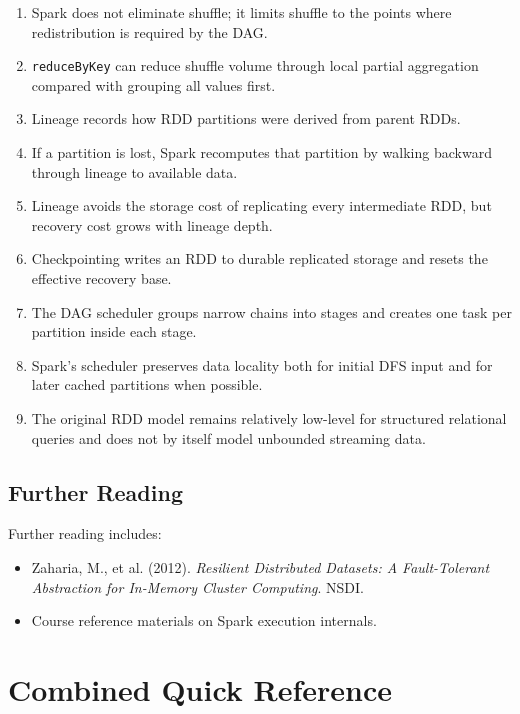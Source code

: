 \documentclass[11pt,a4paper,oneside]{book}
\begin{document}
\begin{enumerate}
    \item Spark does not eliminate shuffle; it limits shuffle to the points where redistribution is required by the DAG.
    \item \texttt{reduceByKey} can reduce shuffle volume through local partial aggregation compared with grouping all values first.
    \item Lineage records how RDD partitions were derived from parent RDDs.
    \item If a partition is lost, Spark recomputes that partition by walking backward through lineage to available data.
    \item Lineage avoids the storage cost of replicating every intermediate RDD, but recovery cost grows with lineage depth.
    \item Checkpointing writes an RDD to durable replicated storage and resets the effective recovery base.
    \item The DAG scheduler groups narrow chains into stages and creates one task per partition inside each stage.
    \item Spark's scheduler preserves data locality both for initial DFS input and for later cached partitions when possible.
    \item The original RDD model remains relatively low-level for structured relational queries and does not by itself model unbounded streaming data.
\end{enumerate}

\section{Further Reading}

Further reading includes:

\begin{itemize}
    \item Zaharia, M., et al. (2012). \emph{Resilient Distributed Datasets: A Fault-Tolerant Abstraction for In-Memory Cluster Computing}. NSDI.
    \item Course reference materials on Spark execution internals.
\end{itemize}



\backmatter
\chapter*{Combined Quick Reference}
\end{document}
